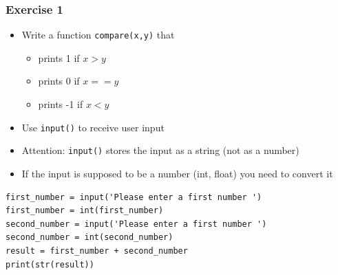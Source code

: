 \documentclass[10pt, a4paper]{beamer} %
\begin{document}
{
\bfseries
\begin{frame}\frametitle{Exercise 1}
    
\begin{itemize}
    \item Write a function \texttt{compare(x,y)} that
    \begin{itemize}
        \item prints 1 if $x > y$
        \item prints 0 if $x == y$
        \item prints -1 if $x < y$
    \end{itemize}
    \item Use \texttt{input()} to receive user input
\end{itemize}

\framebreak

\begin{itemize}
    \item Attention: \texttt{input()} stores the input as a string (not as a number)
    \item If the input is supposed to be a number (int, float) you need to convert it
\end{itemize}

{
\mdseries
{}
\begin{lstlisting}
first_number = input('Please enter a first number ')
first_number = int(first_number)
second_number = input('Please enter a first number ')
second_number = int(second_number)
result = first_number + second_number
print(str(result))
\end{lstlisting}
}

\end{frame}
}
\end{document}
